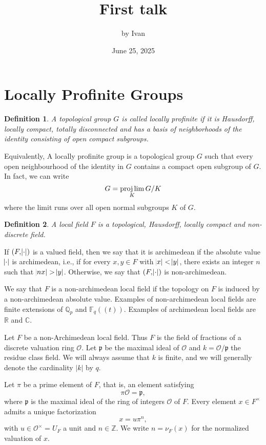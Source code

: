 \documentclass[11pt]{amsart}
\title{First talk}
\author{by Ivan}
\date{June 25, 2025}
\newtheorem{defn}{Definition}
\newcommand{\R}{\mathbb{R}}
\newcommand{\Q}{\mathbb{Q}}
\newcommand{\F}{\mathbb{F}}
\newcommand{\C}{\mathbb{C}}
\begin{document}
\maketitle
\tableofcontents

\section{Locally Profinite Groups}

\begin{defn}
A topological group $G$ is called \textit{locally profinite} if it is Hausdorff, locally compact, totally disconnected and has a basis of neighborhoods of the identity consisting of open compact subgroups.
\end{defn}

Equivalently, A locally profinite group is a topological group $G$ such that
every open neighbourhood of the identity in $G$ contains a compact open subgroup of $G$. In fact, we can write
\[
G = \projlim_{K} G/K
\]
where the limit runs over all open normal subgroups $K$ of $G$.


\begin{defn}
    A local field $F$ is a topological, Hausdorff, locally compact and non-discrete field.
\end{defn}
If $(F,\abs{\cdot})$ is a valued field, then we say that it is archimedean if the absolute value $\abs{\cdot}$ is archimedean, i.e., if for every $x,y \in F$ with $\abs{x} < \abs{y}$, there exists an integer $n$ such that $\abs{nx} > \abs{y}$. Otherwise, we say that $(F,\abs{\cdot})$ is non-archimedean.

We say that $F$ is a non-archimedean local field if the topology on $F$ is induced by a non-archimedean absolute value. Examples of non-archimedean local fields are finite extensions of $\Q_p$ and $\F_q((t))$. Examples of archimedean local fields are $\R$ and $\C$. 

Let $F$ be a non-Archimedean local field. Thus $F$ is the field of fractions of a discrete valuation ring $\mathcal{O}$. Let $\mathfrak{p}$ be the maximal ideal of $\mathcal{O}$ and $k= \mathcal{O}/\mathfrak{p}$ the residue class field. We will always assume that $k$ is finite, and we will generally denote the cardinality $|k|$ by $q$.


Let $\pi$ be a prime element of $F$, that is, an element satisfying
\[
\pi \mathcal{O} = \mathfrak{p},
\]
where $\mathfrak{p}$ is the maximal ideal of the ring of integers $\mathcal{O}$ of $F$.
Every element $x \in F^\times$ admits a unique factorization
\[
x = u \pi^n,
\]
with $u \in \mathcal{O}^\times = U_F$ a unit and $n \in \mathbb{Z}$.
We write $n = \nu_F(x)$ for the normalized valuation of $x$.
\end{document}
